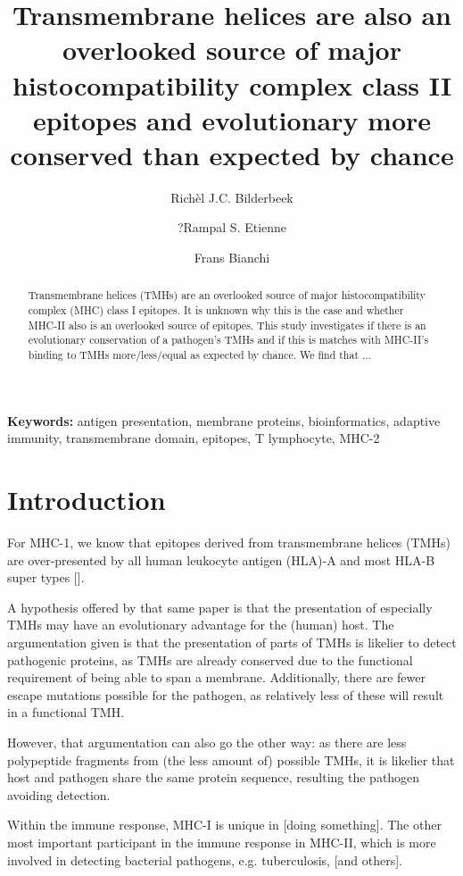 \documentclass{article}
\title{
  Transmembrane helices are also 
  an overlooked source of major histocompatibility complex class II epitopes
  and evolutionary more conserved than expected by chance
}
\author[1]{Rich\`el J.C. Bilderbeek}
\author[1]{?Rampal S. Etienne}
\author[2]{Frans Bianchi}
\affil[1]{Groningen Institute for Evolutionary Life Sciences, University of Groningen, Groningen, The Netherlands}
\affil[2]{Frans' Institute, University of Groningen, Groningen, The Netherlands}
\begin{document}
\maketitle

\begin{abstract}

Transmembrane helices (TMHs) are an overlooked source of 
major histocompatibility complex (MHC) class I epitopes.
It is unknown why this is the case and 
whether MHC-II also is an overlooked source of epitopes.
This study investigates if there is an evolutionary conservation 
of a pathogen's TMHs and if this is matches 
with MHC-II's binding to TMHs more/less/equal as expected by chance.
We find that ...
\end{abstract}

{\bf Keywords:} antigen presentation, membrane proteins, bioinformatics, 
adaptive immunity, transmembrane domain, epitopes, T lymphocyte, MHC-2

\section{Introduction}

For MHC-1, we know that epitopes derived from transmembrane helices (TMHs) are 
over-presented by all human leukocyte antigen (HLA)-A and most HLA-B super 
types [\cite{bianchi2017transmembrane}].

A hypothesis offered by that same paper is that the presentation of 
especially TMHs may have an evolutionary advantage for the (human) host.
The argumentation given is that the presentation of parts of TMHs
is likelier to detect pathogenic proteins, as TMHs are already conserved
due to the functional requirement of being able to span a membrane.
Additionally, there are fewer escape mutations possible for the pathogen,
as relatively less of these will result in a functional TMH.

However, that argumentation can also go the other way: as there are less
polypeptide fragments from (the less amount of) possible TMHs, 
it is likelier that host and pathogen
share the same protein sequence, 
resulting the pathogen avoiding detection.

Within the immune response, MHC-I is unique in [doing something].
The other most important participant in the immune response in MHC-II,
which is more involved in detecting bacterial pathogens, 
e.g. tuberculosis, [and others].
\end{document}
